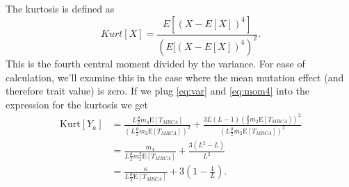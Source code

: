 \documentclass{article}
\newcommand{\T}{\frac{\theta}{2}}
\newcommand{\E}{\mathrm{E}}
\newcommand{\Kurt}{\mathrm{Kurt}}
\begin{document}
The kurtosis is defined as
\begin{equation*}
  Kurt[X]=\frac{E[(X-E[X])^4]}{(E[(X-E[X])^4)^2}.
\end{equation*}
This is the fourth central moment divided by the variance. For ease of
calculation, we'll examine this in the case where the mean mutation effect (and
therefore trait value) is zero. If we plug \eqref{eq:var} and \eqref{eq:mom4}
into the expression for the kurtosis we get
\begin{align*}
  \Kurt[Y_a] &= \frac{L\T m_4 \E[T_{MRCA}]}{\left(L\T m_2 \E[T_{MRCA}]\right)^2} +
  \frac{3L(L-1)\left( \T m_2  \E[T_{MRCA}]\right)^2}{\left(L\T m_2 \E[T_{MRCA}]\right)^2} \nonumber \\
  &= \frac{m_4}{L\T m_2^2\E[T_{MRCA}]} + \frac{3(L^2-L)}{L^2} \nonumber \\
  &= \frac{\kappa}{L\T \E[T_{MRCA}]} + 3\left( 1 - \frac{1}{L} \right).
\end{align*}
\end{document}
